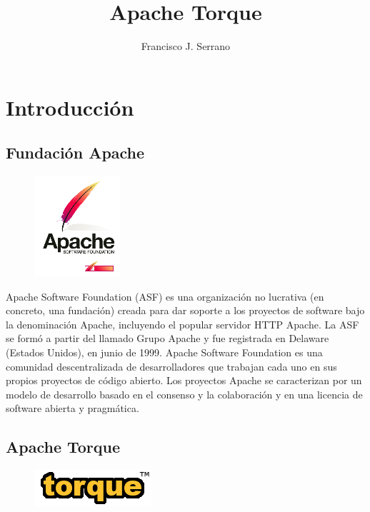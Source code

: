 \documentclass[12pt, oneside]{article}
\title{Apache Torque}
\author{Francisco J. Serrano}
\begin{document}
\maketitle
\tableofcontents

\section{Introducción}

\subsection{Fundación Apache}

\begin{figure}
	\includegraphics[scale=.8]{img/apache-logo.png}
\end{figure}

Apache Software Foundation (ASF) es una organización no lucrativa (en concreto, una fundación) creada para dar soporte a los proyectos de software bajo la denominación Apache, incluyendo el popular servidor HTTP Apache. La ASF se formó a partir del llamado Grupo Apache y fue registrada en Delaware (Estados Unidos), en junio de 1999.
Apache Software Foundation es una comunidad descentralizada de desarrolladores que trabajan cada uno en sus propios proyectos de código abierto. Los proyectos Apache se caracterizan por un modelo de desarrollo basado en el consenso y la colaboración y en una licencia de software abierta y pragmática.

\subsection{Apache Torque}

\begin{figure}
	\includegraphics[scale=.8]{img/torque-logo.png}
\end{figure}
\end{document}
